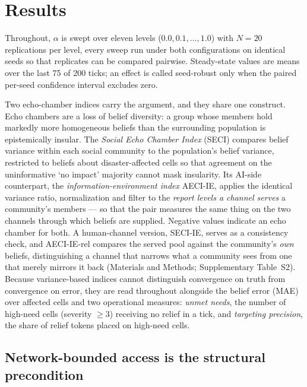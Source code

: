 \documentclass[pdflatex,sn-nature]{sn-jnl}
\begin{document}
\section{Results}\label{sec:results}

Throughout, $\alpha$ is swept over eleven levels ($0.0, 0.1, \ldots, 1.0$) with $N = 20$ replications per level, every sweep run under both configurations on identical seeds so that replicates can be compared pairwise. Steady-state values are means over the last 75 of 200 ticks; an effect is called seed-robust only when the paired per-seed confidence interval excludes zero.

Two echo-chamber indices carry the argument, and they share one construct. Echo chambers are a loss of belief diversity: a group whose members hold markedly more homogeneous beliefs than the surrounding population is epistemically insular. The \emph{Social Echo Chamber Index} (SECI) compares belief variance within each social community to the population's belief variance, restricted to beliefs about disaster-affected cells so that agreement on the uninformative `no impact' majority cannot mask insularity. Its AI-side counterpart, the \emph{information-environment index} AECI-IE, applies the identical variance ratio, normalization and filter to the \emph{report levels a channel serves} a community's members --- so that the pair measures the same thing on the two channels through which beliefs are supplied. Negative values indicate an echo chamber for both. A human-channel version, SECI-IE, serves as a consistency check, and AECI-IE-rel compares the served pool against the community's \emph{own} beliefs, distinguishing a channel that narrows what a community sees from one that merely mirrors it back (Materials and Methods; Supplementary Table~S2). Because variance-based indices cannot distinguish convergence on truth from convergence on error, they are read throughout alongside the belief error (MAE) over affected cells and two operational measures: \emph{unmet needs}, the number of high-need cells (severity $\geq 3$) receiving no relief in a tick, and \emph{targeting precision}, the share of relief tokens placed on high-need cells.

\subsection{Network-bounded access is the structural precondition}\label{sec:claim1}
\end{document}
